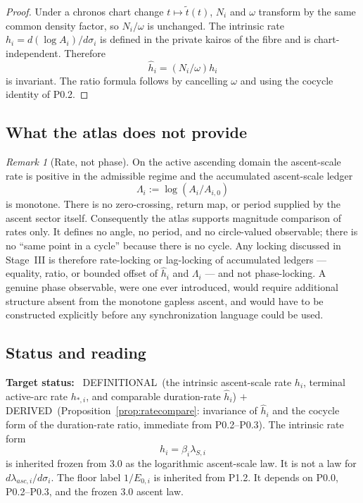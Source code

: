 \documentclass[11pt,a4paper]{article}
\def\mathrm#1{#1}%
\def\emph#1{#1}%
\newcommand{\stDerived}{\textcolor{cDer}{\textsf{\small DERIVED}}}
\newcommand{\stDef}{\textcolor{cDef}{\textsf{\small DEFINITIONAL}}}
\theoremstyle{definition}
\theoremstyle{plain}
\theoremstyle{remark}
\newtheorem{remark}[definition]{Remark}
\begin{document}
\begin{proof}
Under a chronos chart change \(t\mapsto\widetilde t(t)\), \(N_i\) and \(\omega\)
transform by the same common density factor, so \(N_i/\omega\) is unchanged.
The intrinsic rate \(h_i=d(\log A_i)/d\sigma_i\) is defined in the private kairos
of the fibre and is chart-independent. Therefore
\[
\hat h_i=(N_i/\omega)h_i
\]
is invariant. The ratio formula follows by cancelling \(\omega\) and using the
cocycle identity of P0.2. \qedhere
\end{proof}

\subsection{What the atlas does not provide}

\begin{remark}[Rate, not phase]\label{rem:noPhase}
On the active ascending domain the ascent-scale rate is positive in the
admissible regime and the accumulated ascent-scale ledger
\[
\Lambda_i:=\log(A_i/A_{i,0})
\]
is monotone. There is no zero-crossing, return map, or period supplied by the
ascent sector itself. Consequently the
atlas supports \emph{magnitude} comparison of rates only. It defines no angle, no period,
and no circle-valued observable; there is no ``same point in a cycle'' because there is no
cycle. Any locking discussed in Stage~III is therefore rate-locking or lag-locking of
accumulated ledgers --- equality, ratio, or bounded offset of \(\hat h_i\) and
\(\Lambda_i\) --- and not phase-locking. A genuine phase observable, were one
ever introduced, would require additional structure absent from the monotone gapless
ascent, and would have to be constructed explicitly before any synchronization language
could be used.
\end{remark}

\subsection{Status and reading}

\textbf{Target status:}~
\stDef\ (the intrinsic ascent-scale rate \(h_i\), terminal active-arc rate
\(h_{*,i}\), and comparable duration-rate \(\hat h_i\)) \(+\) \stDerived\
(Proposition~\ref{prop:ratecompare}: invariance of \(\hat h_i\) and the cocycle
form of the duration-rate ratio, immediate from P0.2--P0.3). The intrinsic rate
form
\[
h_i=\beta_i\lambda_{S,i}
\]
is inherited frozen from 3.0 as the logarithmic ascent-scale law. It is not a law
for \(d\lambda_{\mathrm{asc},i}/d\sigma_i\). The floor label \(1/E_{0,i}\) is
inherited from P1.2. It depends on P0.0, P0.2--P0.3, and the frozen 3.0
ascent law.
\end{document}
